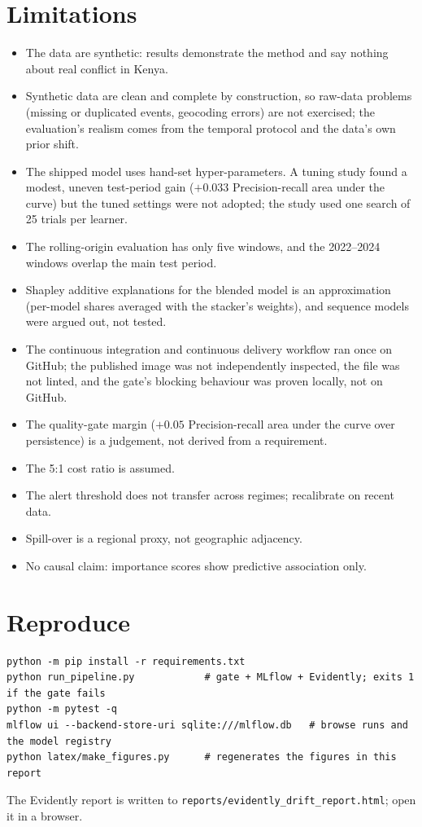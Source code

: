 \documentclass[11pt,a4paper]{article}
\newcommand{\code}[1]{\texttt{#1}}
\begin{document}
\section{Limitations}
\begin{itemize}
  \item The data are synthetic: results demonstrate the method and say nothing about real conflict in Kenya.
  \item Synthetic data are clean and complete by construction, so raw-data problems (missing or duplicated events, geocoding errors) are not exercised; the evaluation's realism comes from the temporal protocol and the data's own prior shift.
  \item The shipped model uses hand-set hyper-parameters. A tuning study found a modest, uneven test-period gain ($+0.033$ Precision-recall area under the curve) but the tuned settings were not adopted; the study used one search of 25 trials per learner.
  \item The rolling-origin evaluation has only five windows, and the 2022--2024 windows overlap the main test period.
  \item Shapley additive explanations for the blended model is an approximation (per-model shares averaged with the stacker's weights), and sequence models were argued out, not tested.
  \item The continuous integration and continuous delivery workflow ran once on GitHub; the published image was not independently inspected, the file was not linted, and the gate's blocking behaviour was proven locally, not on GitHub.
  \item The quality-gate margin ($+0.05$ Precision-recall area under the curve over persistence) is a judgement, not derived from a requirement.
  \item The 5:1 cost ratio is assumed.
  \item The alert threshold does not transfer across regimes; recalibrate on recent data.
  \item Spill-over is a regional proxy, not geographic adjacency.
  \item No causal claim: importance scores show predictive association only.
\end{itemize}

\section{Reproduce}
\begin{lstlisting}
python -m pip install -r requirements.txt
python run_pipeline.py            # gate + MLflow + Evidently; exits 1 if the gate fails
python -m pytest -q
mlflow ui --backend-store-uri sqlite:///mlflow.db   # browse runs and the model registry
python latex/make_figures.py      # regenerates the figures in this report
\end{lstlisting}
The Evidently report is written to \code{reports/evidently\_drift\_report.html}; open it in a browser.
\end{document}
